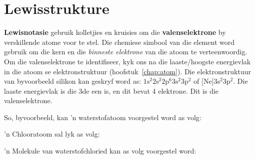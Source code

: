 \section{Lewisstrukture}
    \nopagebreak

\textbf{Lewisnotasie} gebruik kolletjies en kruisies om die \textbf{valenselektrone} by verskillende atome voor te stel. Die chemiese simbool van die element word gebruik om die kern en die \textsl{binneste elektrone} van die atoom te verteenwoordig. Om die valenselektrone te identifiseer, kyk ons na die laaste/hoogste energievlak in die atoom se elektronstruktuur (hoofstuk~\ref{chap:atom}). Die elektronstruktuur van byvoorbeeld silikon kan geskryf word as: $1\text{s}^{2}2\text{s}^{2}2\text{p}^{6}3\text{s}^{2}3\text{p}^{2}$ of $\text{[Ne]}3\text{s}^{2}3\text{p}^{2}$. Die laaste energievlak is die 3de een is, en dit bevat 4 elektrone. Dit is die valenselektrone.
 \par 
So, byvoorbeeld, kan 'n waterstofatoom voorgestel word as volg:  

 'n Chlooratoom sal lyk as volg: 

 'n Molekule van waterstofchloried kan as volg voorgestel word:
\begin{center}
\end{center}

